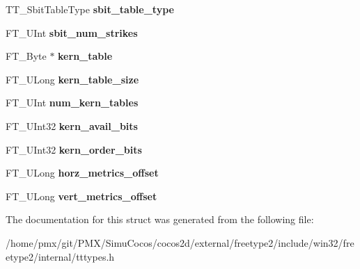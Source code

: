 \begin{DoxyCompactItemize}
T\+T\+\_\+\+Sbit\+Table\+Type {\bfseries sbit\+\_\+table\+\_\+type}
\item 
\mbox{\label{structTT__FaceRec___a763b677d9356ea3ba116d113ebcb39e1}} 
F\+T\+\_\+\+U\+Int {\bfseries sbit\+\_\+num\+\_\+strikes}
\item 
\mbox{\label{structTT__FaceRec___a316a6df6cdf7a978acbb907aeb9c705b}} 
F\+T\+\_\+\+Byte $\ast$ {\bfseries kern\+\_\+table}
\item 
\mbox{\label{structTT__FaceRec___acfef0fabbe95af382fb0710edfe98887}} 
F\+T\+\_\+\+U\+Long {\bfseries kern\+\_\+table\+\_\+size}
\item 
\mbox{\label{structTT__FaceRec___a9c5b27564d0c22e0ee6edd7b6dc675c0}} 
F\+T\+\_\+\+U\+Int {\bfseries num\+\_\+kern\+\_\+tables}
\item 
\mbox{\label{structTT__FaceRec___a5f97232ee6773a57ef8734555cc960e1}} 
F\+T\+\_\+\+U\+Int32 {\bfseries kern\+\_\+avail\+\_\+bits}
\item 
\mbox{\label{structTT__FaceRec___a810b4e002ebbdfcb44005cb69b09a917}} 
F\+T\+\_\+\+U\+Int32 {\bfseries kern\+\_\+order\+\_\+bits}
\item 
\mbox{\label{structTT__FaceRec___a5ff62c77d90743e333ca8dfa7d382f22}} 
F\+T\+\_\+\+U\+Long {\bfseries horz\+\_\+metrics\+\_\+offset}
\item 
\mbox{\label{structTT__FaceRec___a33baf2e26d533d82f06875361fd423d1}} 
F\+T\+\_\+\+U\+Long {\bfseries vert\+\_\+metrics\+\_\+offset}
\end{DoxyCompactItemize}


The documentation for this struct was generated from the following file\+:\begin{DoxyCompactItemize}
\item 
/home/pmx/git/\+P\+M\+X/\+Simu\+Cocos/cocos2d/external/freetype2/include/win32/freetype2/internal/tttypes.\+h\end{DoxyCompactItemize}
